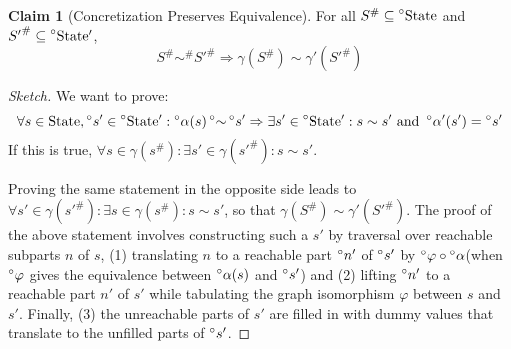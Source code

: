\documentclass{article}
\theoremstyle{definition}
\newtheorem{clm}{Claim}[section]
\newcommand*{\A}[1]{\prescript{\circ}{}{#1}}
\newcommand*{\Abs}[1]{{#1}^{\#}}
\newcommand*{\State}{\text{State}}
\newcommand*{\AState}{\A{\text{State}}}
\newcommand*{\equivalent}{\sim}
\begin{document}
\begin{clm}[Concretization Preserves Equivalence]
  For all $\Abs{S}\subseteq\AState$ and $\Abs{S'}\subseteq\AState'$, 
  \[\Abs{S}\Abs\equivalent\Abs{S'}\Rightarrow\gamma(\Abs{S})\equivalent\gamma'(\Abs{S'})\]
\end{clm}
\begin{proof}[Sketch]
  We want to prove:
  \[\forall s\in\State,\A{s}'\in\AState':\A\alpha(s)\A\equivalent\A{s}'\Rightarrow\exists s'\in\AState':s\equivalent s'\text{ and }\A\alpha'(s')=\A{s}'\]
  If this is true, $\forall s\in\gamma(\Abs{s}):\exists s'\in\gamma(\Abs{s'}):s\equivalent s'$.

  Proving the same statement in the opposite side leads to $\forall s'\in\gamma(\Abs{s'}):\exists s\in\gamma(\Abs{s}):s\equivalent s'$, so that $\gamma(\Abs{S})\equivalent\gamma'(\Abs{S'})$.
  The proof of the above statement involves constructing such a $s'$ by traversal over reachable subparts $n$ of $s$, (1) translating $n$ to a reachable part $\A{n}'$ of $\A{s}'$ by $\A\varphi\circ\A\alpha$(when $\A\varphi$ gives the equivalence between $\A\alpha(s)$ and $\A{s}'$) and (2) lifting $\A{n}'$ to a reachable part $n'$ of $s'$ while tabulating the graph isomorphism $\varphi$ between $s$ and $s'$.
  Finally, (3) the unreachable parts of $s'$ are filled in with dummy values that translate to the unfilled parts of $\A{s}'$.
\end{proof}
\end{document}
